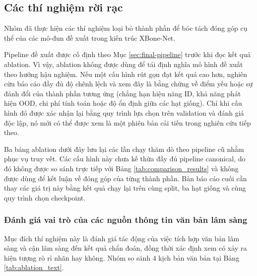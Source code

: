 \subsection{Các thí nghiệm rời rạc}

Nhóm đã thực hiện các thí nghiệm loại bỏ thành phần để bóc tách đóng góp cụ thể của các mô-đun đề xuất trong kiến trúc XBone-Net.

Pipeline đề xuất được cố định theo Mục \ref{sec:final-pipeline} trước khi đọc kết quả ablation. Vì vậy, ablation không được dùng để tái định nghĩa mô hình đề xuất theo hướng hậu nghiệm. Nếu một cấu hình rút gọn đạt kết quả cao hơn, nghiên cứu báo cáo đầy đủ độ chênh lệch và xem đây là bằng chứng về điểm yếu hoặc sự đánh đổi của thành phần tương ứng (chẳng hạn hiệu năng ID, khả năng phát hiện OOD, chi phí tính toán hoặc độ ổn định giữa các hạt giống). Chỉ khi cấu hình đó được xác nhận lại bằng quy trình lựa chọn trên validation và đánh giá độc lập, nó mới có thể được xem là một phiên bản cải tiến trong nghiên cứu tiếp theo.

Ba bảng ablation dưới đây lưu lại các lần chạy thăm dò theo pipeline cũ nhằm
phục vụ truy vết. Các cấu hình này chưa kế thừa đầy đủ pipeline canonical, do đó
không được so sánh trực tiếp với Bảng \ref{tab:comparison_results} và không được
dùng để kết luận về đóng góp của từng thành phần. Bản báo cáo cuối cần thay các
giá trị này bằng kết quả chạy lại trên cùng split, ba hạt giống và cùng quy trình chọn
checkpoint.

\subsubsection{Đánh giá vai trò của các nguồn thông tin văn bản lâm sàng}
Mục đích thí nghiệm này là đánh giá tác động của việc tích hợp văn bản lâm sàng và cận lâm sàng đến kết quả chẩn đoán, đồng thời xác định xem có xảy ra hiện tượng rò rỉ nhãn hay không. Nhóm so sánh 4 kịch bản văn bản tại Bảng \ref{tab:ablation_text}.

\begin{table}[htbp]
\centering
{}
\end{table}

